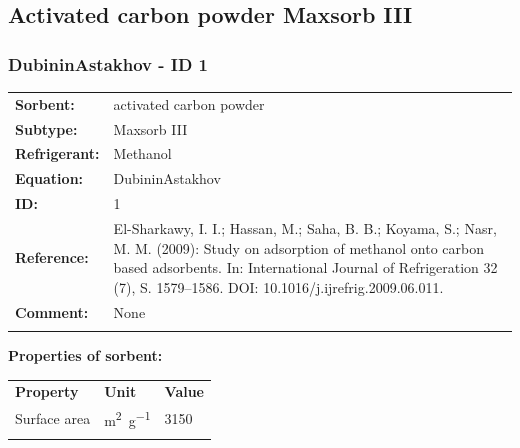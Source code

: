 \subsection{Activated carbon powder Maxsorb III}
%
\subsubsection{DubininAstakhov - ID 1}
%
\begin{tabular}[l]{|lp{11.5cm}|}
\hline
\addlinespace

\textbf{Sorbent:} & activated carbon powder \\
\textbf{Subtype:} & Maxsorb III \\
\textbf{Refrigerant:} & Methanol \\
\textbf{Equation:} & DubininAstakhov \\
\textbf{ID:} & 1 \\
\textbf{Reference:} & El-Sharkawy, I. I.; Hassan, M.; Saha, B. B.; Koyama, S.; Nasr, M. M. (2009): Study on adsorption of methanol onto carbon based adsorbents. In: International Journal of Refrigeration 32 (7), S. 1579–1586. DOI: 10.1016/j.ijrefrig.2009.06.011. \\
\textbf{Comment:} & None \\

\addlinespace
\hline
\end{tabular}
\newline

\textbf{Properties of sorbent:}
\newline
%
\begin{longtable}[l]{lll}
\toprule
\addlinespace
\textbf{Property} & \textbf{Unit} & \textbf{Value} \\
\addlinespace
\midrule
\endhead
\bottomrule
\endfoot
\bottomrule
\endlastfoot
\addlinespace

Surface area & \si{\square\meter\per\gram} & 3150\\

\addlinespace\end{longtable}

